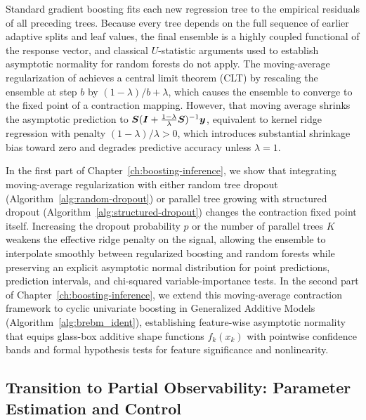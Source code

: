 \begin{aigenblock}
Standard gradient boosting fits each new regression tree to the empirical residuals of all preceding trees. Because every tree depends on the full sequence of earlier adaptive splits and leaf values, the final ensemble is a highly coupled functional of the response vector, and classical $U$-statistic arguments used to establish asymptotic normality for random forests do not apply. The moving-average regularization of \citet{zhou2022boulevard} achieves a central limit theorem (CLT) by rescaling the ensemble at step $b$ by $(1-\lambda)/b + \lambda$, which causes the ensemble to converge to the fixed point of a contraction mapping. However, that moving average shrinks the asymptotic prediction to ${\bm{S}}({\bm{I}} + \frac{1-\lambda}{\lambda}{\bm{S}})^{-1}{\bm{y}}$, equivalent to kernel ridge regression with penalty $(1-\lambda)/\lambda > 0$, which introduces substantial shrinkage bias toward zero and degrades predictive accuracy unless $\lambda=1$.

In the first part of Chapter~\ref{ch:boosting-inference}, we show that integrating moving-average regularization with either random tree dropout (Algorithm~\ref{alg:random-dropout}) or parallel tree growing with structured dropout (Algorithm~\ref{alg:structured-dropout}) changes the contraction fixed point itself. Increasing the dropout probability $p$ or the number of parallel trees $K$ weakens the effective ridge penalty on the signal, allowing the ensemble to interpolate smoothly between regularized boosting and random forests while preserving an explicit asymptotic normal distribution for point predictions, prediction intervals, and chi-squared variable-importance tests. In the second part of Chapter~\ref{ch:boosting-inference}, we extend this moving-average contraction framework to cyclic univariate boosting in Generalized Additive Models (Algorithm~\ref{alg:brebm_ident}), establishing feature-wise asymptotic normality that equips glass-box additive shape functions $f_k(x_k)$ with pointwise confidence bands and formal hypothesis tests for feature significance and nonlinearity.

\subsection{Transition to Partial Observability: Parameter Estimation and Control}


\end{aigenblock}
